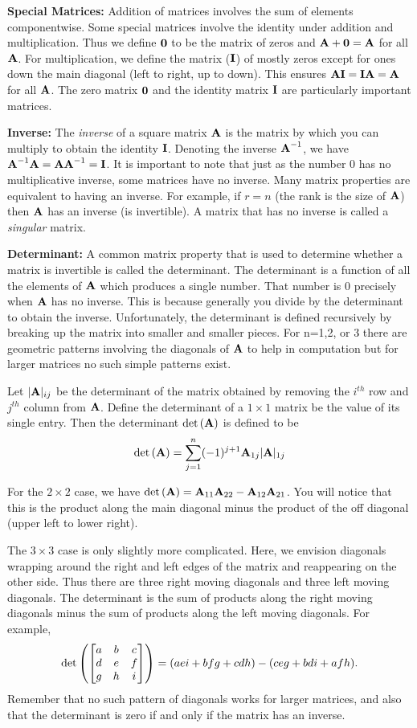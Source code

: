 \medskip
\noindent
{\bf Special Matrices:} 
Addition of matrices involves the sum of elements componentwise.
Some special matrices involve the identity under addition and multiplication.
Thus we define ${\textbf{0}}$ to be the matrix of zeros and ${\textbf{A}}+{\textbf{0}}={\textbf{A}}$ for all ${\textbf{A}}$.
For multiplication, we define the matrix (${\textbf{I}}$) of mostly zeros except for ones down
the main diagonal (left to right, up to down). This ensures ${\textbf{A}}{\textbf{I}}={\textbf{I}}{\textbf{A}}={\textbf{A}}$ for all ${\textbf{A}}$.
The zero matrix ${\textbf{0}}$ and the identity matrix ${\textbf{I}}$ are particularly important matrices.

\medskip
\noindent
{\bf Inverse:}
The \emph{inverse} of a square matrix ${\textbf{A}}$ is the matrix by which you can multiply to
obtain the identity ${\textbf{I}}$.  Denoting the inverse ${\textbf{A}}^{-1}$, we have ${\textbf{A}}^{-1}{\textbf{A}}={\textbf{A}}{\textbf{A}}^{-1}={\textbf{I}}$.
It is important to note that just as the number $0$ has no multiplicative inverse, 
some matrices have no inverse.  Many matrix properties are equivalent to having an inverse.
For example, if $r=n$ (the rank is the size of ${\textbf{A}}$) then ${\textbf{A}}$ has an inverse (is invertible).
A matrix that has no inverse is called a \emph{singular} matrix.

\medskip
\noindent
{\bf Determinant:}
A common matrix property that is used to determine whether a matrix is invertible
is called the determinant.  The determinant is a function of all the elements of ${\textbf{A}}$
which produces a single number.  That number is $0$ precisely when ${\textbf{A}}$ has no inverse.
This is because generally you divide by the determinant to obtain the inverse.
Unfortunately, the determinant is defined recursively by breaking up the matrix into smaller
and smaller pieces.  For n=1,2, or 3 there are geometric patterns involving the diagonals 
of ${\textbf{A}}$ to help in computation but for larger matrices no such simple patterns exist.

Let $|{\textbf{A}}|_{ij}$ be the determinant of the matrix obtained by removing 
the $i^{th}$ row and $j^{th}$ column from ${\textbf{A}}$.  Define the determinant of a $1\times 1$
matrix be the value of its single entry.  Then the determinant $\det{\left( {{\textbf{A}}} \right)}$ is defined
to be 
\[
  \det{\left( {{\textbf{A}}} \right)} = \sum_{j=1}^{n} (-1)^{j+1} {\textbf{A}}_{1j}|{\textbf{A}}|_{1j}
\]

For the $2\times 2$ case, we have $\det{\left( {{\textbf{A}}} \right)} = {\textbf{A}}_{11} {\textbf{A}}_{22} - {\textbf{A}}_{12}{\textbf{A}}_{21}$.
You will notice that this is the product along the main diagonal minus the product
of the off diagonal (upper left to lower right).

The $3\times 3$ case is only slightly more complicated.  Here, we envision diagonals
wrapping around the right and left edges of the matrix and reappearing on the other side.
Thus there are three right moving diagonals and three left moving diagonals.  The determinant
is the sum of products along the right moving diagonals minus the sum of products along the 
left moving diagonals.  For example,
\[
  \det{\left( {\begin{bmatrix} a & b & c \\ d & e & f \\ g & h & i \end{bmatrix}} \right)}=
  (aei+bfg+cdh)-(ceg+bdi+afh).
\]
%
Remember that no such pattern of diagonals works for larger matrices, and also that
the determinant is zero if and only if the matrix has an inverse.

